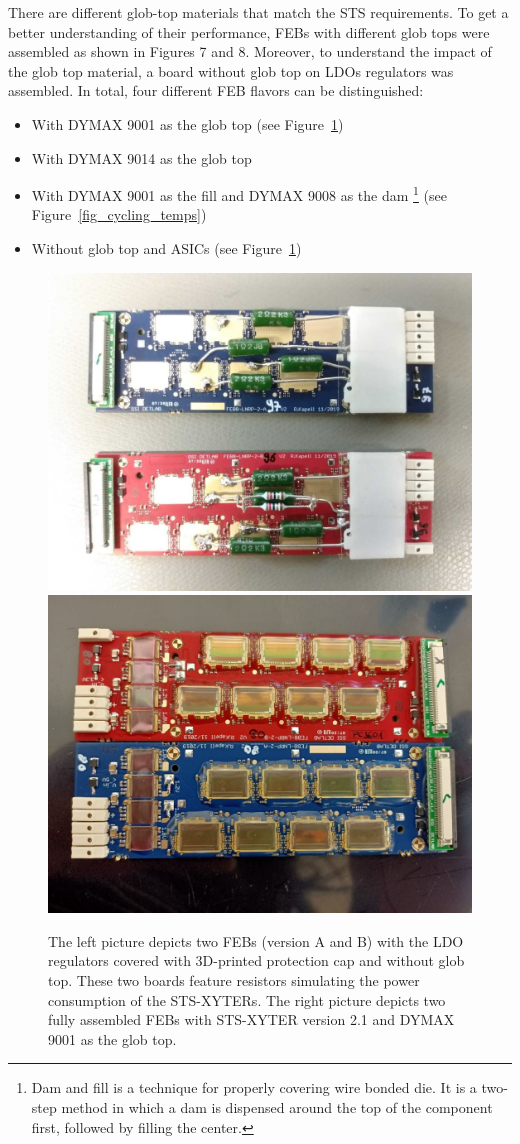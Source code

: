 There are different glob-top materials that match the \gls{STS} requirements. To get a better understanding of
their performance, \glspl{FEB} with different glob tops were assembled as shown in Figures 7 and 8. Moreover,
to understand the impact of the glob top material, a board without glob top on \glspl{LDO} regulators was
assembled. In total, four different FEB flavors can be distinguished:
\begin{itemize}
    \item With DYMAX 9001 as the glob top (see Figure~\ref{fig_noglobtop})
    \item With DYMAX 9014 as the glob top
    \item With DYMAX 9001 as the fill and DYMAX 9008 as the dam \footnote{Dam and fill is a technique for properly covering wire bonded die. It is a two-step method in which a dam is dispensed around the top of the component first, followed by filling the center.} (see Figure~\ref{fig_cycling_temps})
    \item Without glob top and \glspl{ASIC} (see Figure~\ref{fig_noglobtop})
    \end{itemize}
\begin{figure}[!h]
\centering
\includegraphics[width=0.45\columnwidth]{Chapter4/images/noglobtop.jpg}
\includegraphics[width=0.45\columnwidth]{Chapter4/images/globtop.jpg}
\caption{The left picture depicts two \glspl{FEB} (version A and B) with the \gls{LDO} regulators covered with 3D-printed protection cap and without glob top. These two boards feature resistors simulating the power consumption of the STS-XYTERs.
The right picture depicts two fully assembled \gls{FEB}s with STS-XYTER version 2.1 and DYMAX 9001 as the glob top.}
\label{fig_noglobtop}
\end{figure}

